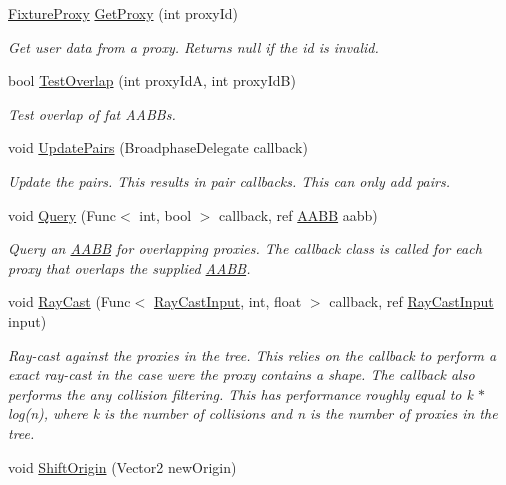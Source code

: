 \begin{DoxyCompactItemize}
\hyperlink{struct_farseer_physics_1_1_dynamics_1_1_fixture_proxy}{Fixture\+Proxy} \hyperlink{class_farseer_physics_1_1_collision_1_1_dynamic_tree_broad_phase_aa4dd50882866b245e98b1ba569a0e4c5}{Get\+Proxy} (int proxy\+Id)
\begin{DoxyCompactList}\small\item\em Get user data from a proxy. Returns null if the id is invalid. \end{DoxyCompactList}\item 
bool \hyperlink{class_farseer_physics_1_1_collision_1_1_dynamic_tree_broad_phase_a3851d66b0cb7a1537cc45786aaf71370}{Test\+Overlap} (int proxy\+Id\+A, int proxy\+Id\+B)
\begin{DoxyCompactList}\small\item\em Test overlap of fat A\+A\+B\+Bs. \end{DoxyCompactList}\item 
void \hyperlink{class_farseer_physics_1_1_collision_1_1_dynamic_tree_broad_phase_ab4d80cf0607521a387315f7a3cff0ae0}{Update\+Pairs} (Broadphase\+Delegate callback)
\begin{DoxyCompactList}\small\item\em Update the pairs. This results in pair callbacks. This can only add pairs. \end{DoxyCompactList}\item 
void \hyperlink{class_farseer_physics_1_1_collision_1_1_dynamic_tree_broad_phase_a6e5d585670c83a9358fd072a0ceeda47}{Query} (Func$<$ int, bool $>$ callback, ref \hyperlink{struct_farseer_physics_1_1_collision_1_1_a_a_b_b}{A\+A\+B\+B} aabb)
\begin{DoxyCompactList}\small\item\em Query an \hyperlink{struct_farseer_physics_1_1_collision_1_1_a_a_b_b}{A\+A\+B\+B} for overlapping proxies. The callback class is called for each proxy that overlaps the supplied \hyperlink{struct_farseer_physics_1_1_collision_1_1_a_a_b_b}{A\+A\+B\+B}. \end{DoxyCompactList}\item 
void \hyperlink{class_farseer_physics_1_1_collision_1_1_dynamic_tree_broad_phase_a13ea808d72afd3008013f009e2b37958}{Ray\+Cast} (Func$<$ \hyperlink{struct_farseer_physics_1_1_collision_1_1_ray_cast_input}{Ray\+Cast\+Input}, int, float $>$ callback, ref \hyperlink{struct_farseer_physics_1_1_collision_1_1_ray_cast_input}{Ray\+Cast\+Input} input)
\begin{DoxyCompactList}\small\item\em Ray-\/cast against the proxies in the tree. This relies on the callback to perform a exact ray-\/cast in the case were the proxy contains a shape. The callback also performs the any collision filtering. This has performance roughly equal to k $\ast$ log(n), where k is the number of collisions and n is the number of proxies in the tree. \end{DoxyCompactList}\item 
void \hyperlink{class_farseer_physics_1_1_collision_1_1_dynamic_tree_broad_phase_a2cc2e2522b117183cb8cd1145c3781ab}{Shift\+Origin} (Vector2 new\+Origin)
\end{DoxyCompactItemize}
